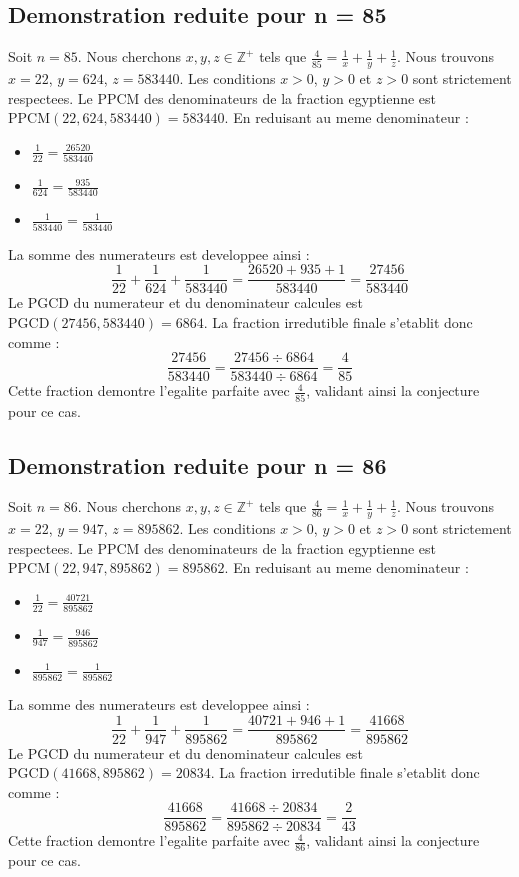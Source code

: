 \documentclass[11pt,a4paper]{article}
\begin{document}
\subsection{Demonstration reduite pour n = 85}
Soit $n = 85$. Nous cherchons $x, y, z \in \mathbb{Z}^{+}$ tels que $\frac{4}{85} = \frac{1}{x} + \frac{1}{y} + \frac{1}{z}$.
Nous trouvons $x = 22$, $y = 624$, $z = 583440$.
Les conditions $x > 0$, $y > 0$ et $z > 0$ sont strictement respectees.
Le PPCM des denominateurs de la fraction egyptienne est $\text{PPCM}(22, 624, 583440) = 583440$.
En reduisant au meme denominateur :
\begin{itemize}
    \item $\frac{1}{22} = \frac{26520}{583440}$
    \item $\frac{1}{624} = \frac{935}{583440}$
    \item $\frac{1}{583440} = \frac{1}{583440}$
\end{itemize}
La somme des numerateurs est developpee ainsi :
$$ \frac{1}{22} + \frac{1}{624} + \frac{1}{583440} = \frac{26520 + 935 + 1}{583440} = \frac{27456}{583440} $$
Le PGCD du numerateur et du denominateur calcules est $\text{PGCD}(27456, 583440) = 6864$.
La fraction irredutible finale s'etablit donc comme :
$$ \frac{27456}{583440} = \frac{27456 \div 6864}{583440 \div 6864} = \frac{4}{85} $$
Cette fraction demontre l'egalite parfaite avec $\frac{4}{85}$, validant ainsi la conjecture pour ce cas.

\subsection{Demonstration reduite pour n = 86}
Soit $n = 86$. Nous cherchons $x, y, z \in \mathbb{Z}^{+}$ tels que $\frac{4}{86} = \frac{1}{x} + \frac{1}{y} + \frac{1}{z}$.
Nous trouvons $x = 22$, $y = 947$, $z = 895862$.
Les conditions $x > 0$, $y > 0$ et $z > 0$ sont strictement respectees.
Le PPCM des denominateurs de la fraction egyptienne est $\text{PPCM}(22, 947, 895862) = 895862$.
En reduisant au meme denominateur :
\begin{itemize}
    \item $\frac{1}{22} = \frac{40721}{895862}$
    \item $\frac{1}{947} = \frac{946}{895862}$
    \item $\frac{1}{895862} = \frac{1}{895862}$
\end{itemize}
La somme des numerateurs est developpee ainsi :
$$ \frac{1}{22} + \frac{1}{947} + \frac{1}{895862} = \frac{40721 + 946 + 1}{895862} = \frac{41668}{895862} $$
Le PGCD du numerateur et du denominateur calcules est $\text{PGCD}(41668, 895862) = 20834$.
La fraction irredutible finale s'etablit donc comme :
$$ \frac{41668}{895862} = \frac{41668 \div 20834}{895862 \div 20834} = \frac{2}{43} $$
Cette fraction demontre l'egalite parfaite avec $\frac{4}{86}$, validant ainsi la conjecture pour ce cas.
\end{document}
